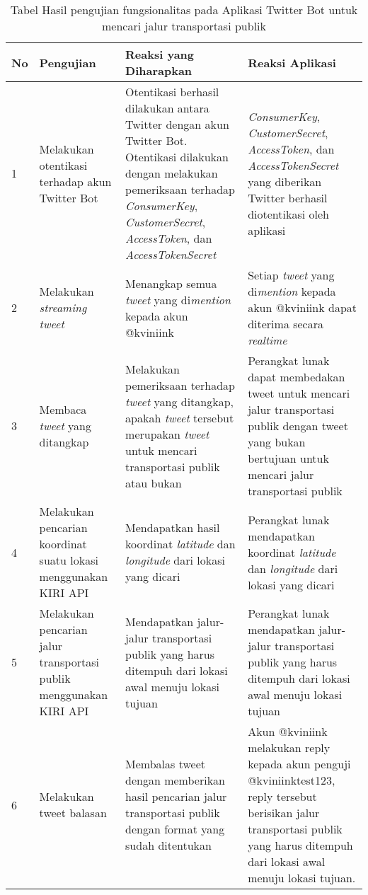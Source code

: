 \begin{table}[h]
		\begin{tabular}{|p{0.5cm}|p{3cm}|p{5cm}|p{5cm}|}
			\hline
				No & Pengujian & Reaksi yang Diharapkan & Reaksi Aplikasi  \\ \hline
				1 & Melakukan otentikasi terhadap akun Twitter Bot & Otentikasi berhasil dilakukan antara Twitter dengan akun Twitter Bot. Otentikasi dilakukan dengan melakukan pemeriksaan terhadap \textit{ConsumerKey}, \textit{CustomerSecret}, \textit{AccessToken}, dan \textit{AccessTokenSecret} &  \textit{ConsumerKey}, \textit{CustomerSecret}, \textit{AccessToken}, dan \textit{AccessTokenSecret} yang diberikan Twitter berhasil diotentikasi oleh aplikasi \\ \hline
				2 & Melakukan \textit{streaming tweet} & Menangkap semua \textit{tweet} yang di\textit{mention} kepada akun @kviniink & Setiap \textit{tweet} yang di\textit{mention} kepada akun @kviniink dapat diterima secara \textit{realtime}\\ \hline
				3 & Membaca \textit{tweet} yang ditangkap & Melakukan pemeriksaan terhadap \textit{tweet} yang ditangkap, apakah \textit{tweet} tersebut merupakan \textit{tweet} untuk mencari transportasi publik atau bukan & Perangkat lunak dapat membedakan tweet untuk mencari jalur transportasi publik dengan tweet yang bukan bertujuan untuk mencari jalur transportasi publik  \\ \hline
				4 & Melakukan pencarian koordinat suatu lokasi menggunakan KIRI API & Mendapatkan hasil koordinat \textit{latitude} dan \textit{longitude} dari lokasi yang dicari & Perangkat lunak mendapatkan koordinat \textit{latitude} dan \textit{longitude} dari lokasi yang dicari  \\ \hline
				5 & Melakukan pencarian jalur transportasi publik menggunakan KIRI API & Mendapatkan jalur-jalur transportasi publik yang harus ditempuh dari lokasi awal menuju lokasi tujuan &  Perangkat lunak mendapatkan jalur-jalur transportasi publik yang harus ditempuh dari lokasi awal menuju lokasi tujuan \\ \hline
				6 & Melakukan tweet balasan & Membalas tweet dengan memberikan hasil pencarian jalur transportasi publik dengan format yang sudah ditentukan &  Akun @kviniink melakukan reply kepada akun penguji @kviniinktest123, reply tersebut berisikan jalur transportasi publik yang harus ditempuh dari lokasi awal menuju lokasi tujuan.\\ \hline
		\end{tabular}
	\caption{Tabel Hasil pengujian fungsionalitas pada Aplikasi Twitter Bot untuk mencari jalur transportasi publik}
	\label{tab:TabelHasilPengujianFungsionalitasPadaAplikasiTwitterBotUntukMencariJalurTransportasiPublik}
\end{table}

